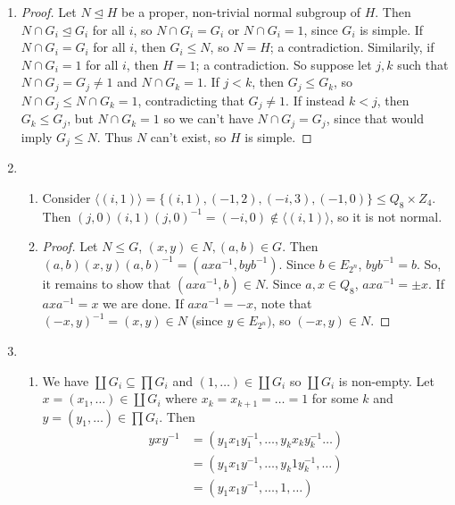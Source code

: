 \documentclass[11pt, letterpaper]{article}
\begin{document}
\thispagestyle{firststyle}


\begin{enumerate}
  \item \begin{proof}
    Let $N \trianglelefteq H$ be a proper, non-trivial normal subgroup of $H$. Then $N \cap G_i \trianglelefteq G_i$ for all $i$, so $N \cap G_i = G_i$ or $N \cap G_i = 1$, since $G_i$ is simple. If $N \cap G_i = G_i$ for all $i$, then $G_i \leq N$, so $N = H$; a contradiction. Similarily, if $N \cap G_i = 1$ for all $i$, then $H = 1$; a contradiction. So suppose let $j, k$ such that $N \cap G_j = G_j \neq 1$ and $N \cap G_k = 1$. If $j < k$, then $G_j \leq G_k$, so $N \cap G_j \leq N \cap G_k = 1$, contradicting that $G_j \neq 1$. If instead $k < j$, then $G_k \leq G_j$, but $N \cap G_k = 1$ so we can't have $N \cap G_j = G_j$, since that would imply $G_j \leq N$. Thus $N$ can't exist, so $H$ is simple.
  \end{proof}

  \item \begin{enumerate}
    \item Consider $\langle (i, 1) \rangle = \lbrace (i, 1), (-1, 2), (-i, 3), (-1, 0) \rbrace \leq Q_8 \times Z_4$. Then $(j, 0)(i, 1)(j, 0)^{-1} = (-i, 0) \notin \langle (i, 1) \rangle$, so it is not normal.
    \item \begin{proof}
      Let $N \leq G$, $(x, y) \in N, (a, b) \in G$. Then $(a, b)(x, y)(a, b)^{-1} = (axa^{-1}, byb^{-1})$. Since $b \in E_{2^n}$, $byb^{-1} = b$. So, it remains to show that $(axa^{-1}, b) \in N$. Since $a, x \in Q_8$, $axa^{-1} = \pm x$. If $axa^{-1} = x$ we are done. If $axa^{-1} = -x$, note that $(-x, y)^{-1} = (x, y) \in N$ (since $y \in E_{2^n})$, so $(-x, y) \in N$.
    \end{proof}
  \end{enumerate}

  \item \begin{enumerate}
    \item We have $\coprod G_i \subseteq \prod G_i$ and $(1, \dots) \in \coprod G_i$ so $\coprod G_i$ is non-empty. Let $x = (x_1, \dots) \in \coprod G_i$ where $x_k = x_{k + 1} = \dots = 1$ for some $k$ and $y = (y_1, \dots) \in \prod G_i$. Then
    \begin{align*}
      yxy^{-1} &= (y_1 x_1 y_1^{-1}, \dots, y_k x_k y_k^{-1} \dots) \\
      &= (y_1x_1y^{-1}, \dots, y_k 1 y_k^{-1}, \dots) \\
      &= (y_1 x_1 y^{-1}, \dots, 1, \dots)
    \end{align*}


\end{enumerate}
\end{enumerate}
\end{document}
